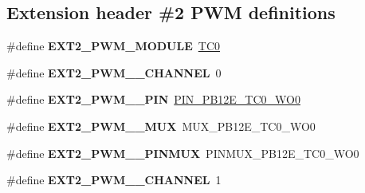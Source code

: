 \subsection*{Extension header \#2 P\+W\+M definitions}
\begin{DoxyCompactItemize}
\item 
\hypertarget{group__saml21__xplained__pro__features__group_ga4065afb7edcb95b1119a9e48d6891326}{}\#define {\bfseries E\+X\+T2\+\_\+\+P\+W\+M\+\_\+\+M\+O\+D\+U\+L\+E}~\hyperlink{group___s_a_m_l21_j18_a__base_ga52e2ffca944a6935b5ac85cfa8157f34}{T\+C0}\label{group__saml21__xplained__pro__features__group_ga4065afb7edcb95b1119a9e48d6891326}

\item 
\hypertarget{group__saml21__xplained__pro__features__group_ga6d520cd848a0df7fe5b1cfa44c3a77ac}{}\#define {\bfseries E\+X\+T2\+\_\+\+P\+W\+M\+\_\+\_\+\+C\+H\+A\+N\+N\+E\+L}~0\label{group__saml21__xplained__pro__features__group_ga6d520cd848a0df7fe5b1cfa44c3a77ac}

\item 
\hypertarget{group__saml21__xplained__pro__features__group_gab1bc229e3900ec14f5e718a435567549}{}\#define {\bfseries E\+X\+T2\+\_\+\+P\+W\+M\+\_\+\_\+\+P\+I\+N}~\hyperlink{pio_2saml21j18a_8h_acde5d39728c9dad5f7e389ccffd50c5f}{P\+I\+N\+\_\+\+P\+B12\+E\+\_\+\+T\+C0\+\_\+\+W\+O0}\label{group__saml21__xplained__pro__features__group_gab1bc229e3900ec14f5e718a435567549}

\item 
\hypertarget{group__saml21__xplained__pro__features__group_gaf3d83c1098af352df8b4411102d0defa}{}\#define {\bfseries E\+X\+T2\+\_\+\+P\+W\+M\+\_\+\_\+\+M\+U\+X}~M\+U\+X\+\_\+\+P\+B12\+E\+\_\+\+T\+C0\+\_\+\+W\+O0\label{group__saml21__xplained__pro__features__group_gaf3d83c1098af352df8b4411102d0defa}

\item 
\hypertarget{group__saml21__xplained__pro__features__group_gab651a3d9a5cc47de89da5390125b60ef}{}\#define {\bfseries E\+X\+T2\+\_\+\+P\+W\+M\+\_\+\_\+\+P\+I\+N\+M\+U\+X}~P\+I\+N\+M\+U\+X\+\_\+\+P\+B12\+E\+\_\+\+T\+C0\+\_\+\+W\+O0\label{group__saml21__xplained__pro__features__group_gab651a3d9a5cc47de89da5390125b60ef}

\item 
\hypertarget{group__saml21__xplained__pro__features__group_ga8230fa68feeedc7a491be3d10c7d6bce}{}\#define {\bfseries E\+X\+T2\+\_\+\+P\+W\+M\+\_\+\_\+\+C\+H\+A\+N\+N\+E\+L}~1\label{group__saml21__xplained__pro__features__group_ga8230fa68feeedc7a491be3d10c7d6bce}


\end{DoxyCompactItemize}
